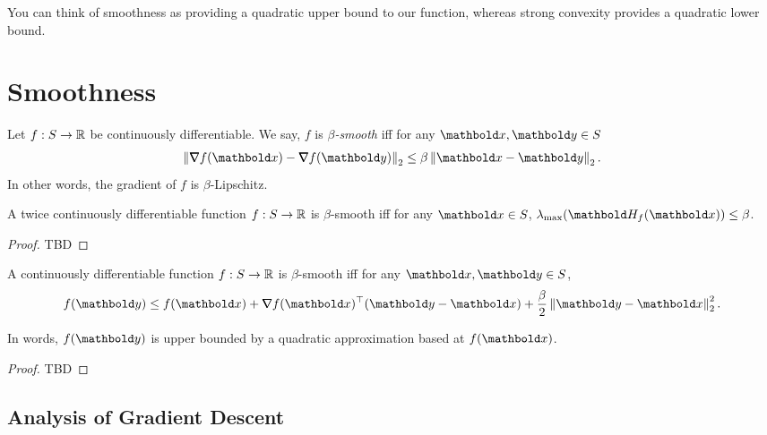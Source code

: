 You can think of smoothness as providing a quadratic upper bound to our function, whereas strong convexity provides a quadratic lower bound.

\section{Smoothness}

\begin{defn}[Smoothness] Let $f: S \to \mathbb{R}$ be continuously differentiable. We say, $f$ is \emph{$\beta$-smooth} iff for any $\vx, \vy \in \sS$ \begin{align}
    \norm{\grad f(\vx) - \grad f(\vy)}_2 \leq \beta \norm{\vx - \vy}_2.
\end{align} In other words, the gradient of $f$ is $\beta$-Lipschitz.
\end{defn}
\begin{lem}
A twice continuously differentiable function $f: S \to \mathbb{R}$ is $\beta$-smooth iff for any $\vx \in \sS$, $\lambda_{\max}(\mH_f(\vx)) \leq \beta$.
\end{lem}
\begin{proof}
TBD
\end{proof}
\begin{lem}
A continuously differentiable function $f: S \to \mathbb{R}$ is $\beta$-smooth iff for any $\vx, \vy \in \sS$, \begin{align}
    f(\vy) \leq f(\vx) + \trans{\grad f(\vx)}(\vy - \vx) + \frac{\beta}{2}\norm{\vy - \vx}_2^2.
\end{align}
\end{lem} In words, $f(\vy)$ is upper bounded by a quadratic approximation based at $f(\vx)$.
\begin{proof}
TBD
\end{proof}

\subsection{Analysis of Gradient Descent}

